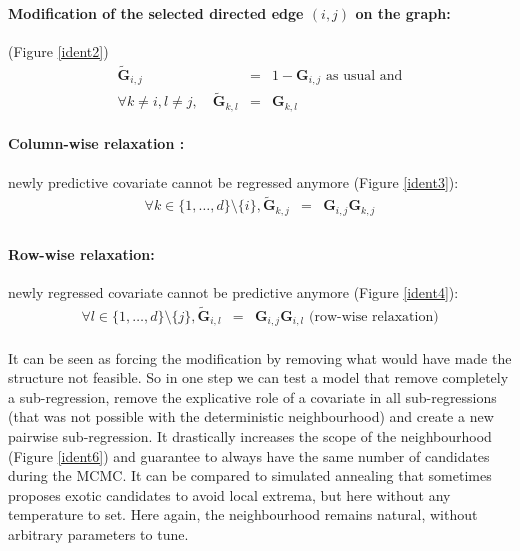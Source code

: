 \documentclass[12pt,a4paper]{report}
\begin{document}
		\paragraph{Modification of the selected directed edge $(i,j)$ on the graph:} (Figure \ref{ident2})
	\begin{eqnarray}
		\tilde{\boldsymbol{G}}_{i,j}&=&1-\boldsymbol{G}_{i,j} \textrm{ as usual and} \nonumber \\
		\forall k \neq i, l\neq j, \quad	\tilde{\boldsymbol{G}}_{k,l}&=&\boldsymbol{G}_{k,l} \nonumber 
\end{eqnarray}	
\paragraph{Column-wise relaxation :}		
newly predictive covariate cannot be regressed anymore (Figure \ref{ident3}):
		\begin{eqnarray}
		\forall k \in \{1,\dots,d\}\setminus \{i\}, \tilde{\boldsymbol{G}}_{k,j}&=&\boldsymbol{G}_{i,j}\boldsymbol{G}_{k,j}  \nonumber  \\
				\end{eqnarray}
\paragraph{Row-wise relaxation:} newly regressed covariate cannot be predictive anymore (Figure \ref{ident4}):
		\begin{eqnarray}
		\forall l \in \{1,\dots,d\}\setminus \{j\}, \tilde{\boldsymbol{G}}_{i,l}&=&\boldsymbol{G}_{i,j}\boldsymbol{G}_{i,l} \textrm{ (row-wise relaxation)} \nonumber 
	\end{eqnarray} \\
	
	It can be seen as forcing the modification by removing what would have made the structure not feasible. So in one step we can test a model that remove completely a sub-regression, remove the explicative role of a covariate in all sub-regressions (that was not possible with the deterministic neighbourhood) and create a new pairwise sub-regression. It drastically increases the scope of the neighbourhood (Figure \ref{ident6}) and guarantee to always have the same number of candidates during the MCMC. It can be compared to simulated annealing that sometimes proposes exotic candidates to avoid local extrema, but here without any temperature to set. Here again, the neighbourhood remains natural, without arbitrary parameters to tune. \\
	
\end{document}
